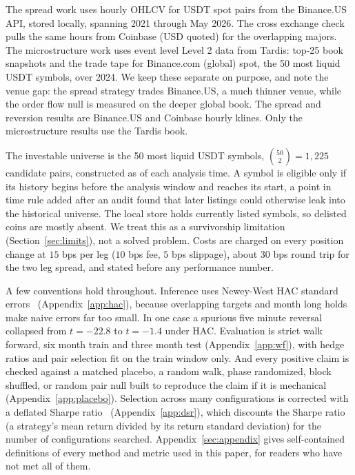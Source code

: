 \documentclass[11pt]{article}
\begin{document}
The spread work uses hourly OHLCV for USDT spot pairs from the Binance.US API, stored locally,
spanning 2021 through May 2026. The cross exchange check pulls the same hours from Coinbase
(USD quoted) for the overlapping majors. The microstructure work uses event level Level 2 data
from Tardis: top-25 book snapshots and the trade tape for Binance.com (global) spot, the 50 most liquid USDT
symbols, over 2024. We keep these separate on purpose, and note the venue gap: the spread strategy trades Binance.US, a
much thinner venue, while the order flow null is measured on the deeper global book. The spread and
reversion results are Binance.US and Coinbase hourly klines. Only the microstructure results use
the Tardis book.

The investable universe is the 50 most liquid USDT symbols, $\binom{50}{2}=1{,}225$ candidate
pairs, constructed as of each analysis time. A
symbol is eligible only if its history begins before the analysis window and reaches its start, a
point in time rule added after an audit found that later listings could otherwise leak into the
historical universe. The local store holds currently listed symbols, so delisted coins are mostly
absent. We treat this as a survivorship limitation (Section~\ref{sec:limits}), not a solved
problem. Costs are charged on every position change at $15$ bps per leg ($10$ bps fee, $5$ bps
slippage), about $30$ bps round trip for the two leg spread, and stated before any performance
number.

A few conventions hold throughout. Inference uses Newey-West HAC standard
errors~\cite{newey1987hac} (Appendix~\ref{app:hac}), because overlapping
targets and month long holds make naive errors far too small. In one case a spurious five minute
reversal collapsed from $t = -22.8$ to $t = -1.4$ under HAC. Evaluation is strict walk forward,
six month train and three month test (Appendix~\ref{app:wf}), with hedge ratios and pair selection fit on the train
window only. And every positive claim is checked against a matched placebo, a random walk,
phase randomized, block shuffled, or random pair null built to reproduce the claim if it is
mechanical (Appendix~\ref{app:placebo}). Selection across many configurations is corrected with a deflated Sharpe
ratio~\cite{bailey2014dsr} (Appendix~\ref{app:dsr}), which discounts the Sharpe ratio (a strategy's mean return divided by its return standard deviation) for the number of configurations searched. Appendix~\ref{sec:appendix} gives self-contained definitions of every method and metric used in this paper, for readers who have not met all of them.
\end{document}
